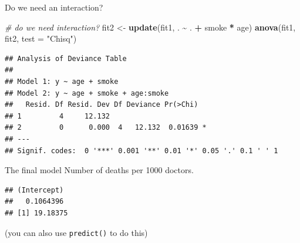 \documentclass[
  ignorenonframetext,
]{beamer}
\newenvironment{Shaded}{\begin{snugshade}}{\end{snugshade}}
\newcommand{\AttributeTok}[1]{\textcolor[rgb]{0.13,0.29,0.53}{#1}}
\newcommand{\CommentTok}[1]{\textcolor[rgb]{0.56,0.35,0.01}{\textit{#1}}}
\newcommand{\DecValTok}[1]{\textcolor[rgb]{0.00,0.00,0.81}{#1}}
\newcommand{\FunctionTok}[1]{\textcolor[rgb]{0.13,0.29,0.53}{\textbf{#1}}}
\newcommand{\NormalTok}[1]{#1}
\newcommand{\OtherTok}[1]{\textcolor[rgb]{0.56,0.35,0.01}{#1}}
\newcommand{\SpecialCharTok}[1]{\textcolor[rgb]{0.81,0.36,0.00}{\textbf{#1}}}
\newcommand{\StringTok}[1]{\textcolor[rgb]{0.31,0.60,0.02}{#1}}
\begin{document}
\begin{frame}[fragile]{Do we need an interaction?}
\protect\hypertarget{do-we-need-an-interaction}{}
\begin{Shaded}
\begin{Highlighting}[]
\CommentTok{\# do we need interaction?}
\NormalTok{fit2 }\OtherTok{\textless{}{-}} \FunctionTok{update}\NormalTok{(fit1, . }\SpecialCharTok{\textasciitilde{}}\NormalTok{ . }\SpecialCharTok{+}\NormalTok{ smoke }\SpecialCharTok{*}\NormalTok{ age)}
\FunctionTok{anova}\NormalTok{(fit1, fit2, }\AttributeTok{test =} \StringTok{"Chisq"}\NormalTok{)}
\end{Highlighting}
\end{Shaded}

\begin{verbatim}
## Analysis of Deviance Table
## 
## Model 1: y ~ age + smoke
## Model 2: y ~ age + smoke + age:smoke
##   Resid. Df Resid. Dev Df Deviance Pr(>Chi)  
## 1         4     12.132                       
## 2         0      0.000  4   12.132  0.01639 *
## ---
## Signif. codes:  0 '***' 0.001 '**' 0.01 '*' 0.05 '.' 0.1 ' ' 1
\end{verbatim}
\end{frame}

\begin{frame}[fragile]{The final model}
\protect\hypertarget{the-final-model}{}
Number of deaths per 1000 doctors.

\begin{Shaded}
\end{Shaded}

\begin{verbatim}
## (Intercept) 
##   0.1064396 
## [1] 19.18375
\end{verbatim}

(you can also use \texttt{predict()} to do this)
\end{frame}
\end{document}
